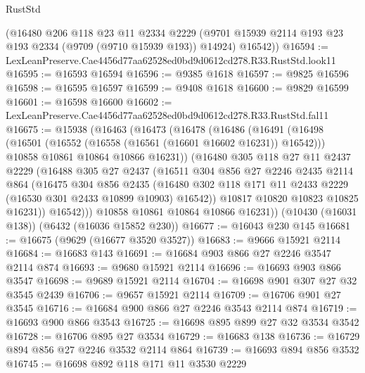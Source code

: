 \begin{lexlean}{RustStd}
\begin{coremodule}
      (@16480
        @206
        @118
        @23
        @11
        @2334
        @2229
        (@9701 @15939 @2114 @193 @23 @193 @2334 (@9709 (@9710 @15939 @193)) @14924)
        @16542))
@16594 := LexLeanPreserve.Cae4456d77aa62528ed0bd9d0612cd278.R33.RustStd.look11
@16595 := @16593 @16594
@16596 := @9385 @1618
@16597 := @9825 @16596
@16598 := @16595 @16597
@16599 := @9408 @1618
@16600 := @9829 @16599
@16601 := @16598 @16600
@16602 := LexLeanPreserve.Cae4456d77aa62528ed0bd9d0612cd278.R33.RustStd.fal11
@16675 := @15938
    (@16463
      (@16473
        (@16478
          (@16486
            (@16491
              (@16498
                (@16501 (@16552 (@16558 (@16561 (@16601 @16602 @16231)) @16542)))
                @10858
                @10861
                @10864
                @10866
                @16231))
            (@16480
              @305
              @118
              @27
              @11
              @2437
              @2229
              (@16488
                @305
                @27
                @2437
                (@16511
                  @304
                  @856
                  @27
                  @2246
                  @2435
                  @2114
                  @864
                  (@16475
                    @304
                    @856
                    @2435
                    (@16480
                      @302
                      @118
                      @171
                      @11
                      @2433
                      @2229
                      (@16530 @301 @2433 @10899 @10903)
                      @16542))
                  @10817
                  @10820
                  @10823
                  @10825
                  @16231))
              @16542)))
        @10858
        @10861
        @10864
        @10866
        @16231))
    (@10430 (@16031 @138))
    (@6432 (@16036 @15852 @230))
@16677 := @16043 @230 @145
@16681 := @16675 (@9629 (@16677 @3520 @3527))
@16683 := @9666 @15921 @2114
@16684 := @16683 @143
@16691 := @16684 @903 @866 @27 @2246 @3547 @2114 @874
@16693 := @9680 @15921 @2114
@16696 := @16693 @903 @866 @3547
@16698 := @9689 @15921 @2114
@16704 := @16698 @901 @307 @27 @32 @3545 @2439
@16706 := @9657 @15921 @2114
@16709 := @16706 @901 @27 @3545
@16716 := @16684 @900 @866 @27 @2246 @3543 @2114 @874
@16719 := @16693 @900 @866 @3543
@16725 := @16698 @895 @899 @27 @32 @3534 @3542
@16728 := @16706 @895 @27 @3534
@16729 := @16683 @138
@16736 := @16729 @894 @856 @27 @2246 @3532 @2114 @864
@16739 := @16693 @894 @856 @3532
@16745 := @16698 @892 @118 @171 @11 @3530 @2229

\end{coremodule}
\end{lexlean}
